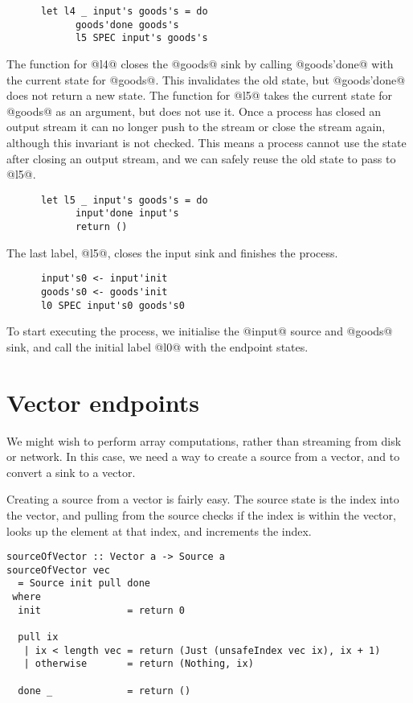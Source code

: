 \begin{lstlisting}
      let l4 _ input's goods's = do
            goods'done goods's
            l5 SPEC input's goods's
\end{lstlisting}

The function for @l4@ closes the @goods@ sink by calling @goods'done@ with the current state for @goods@.
This invalidates the old state, but @goods'done@ does not return a new state.
The function for @l5@ takes the current state for @goods@ as an argument, but does not use it.
Once a process has closed an output stream it can no longer push to the stream or close the stream again, although this invariant is not checked.
This means a process cannot use the state after closing an output stream, and we can safely reuse the old state to pass to @l5@.

\begin{lstlisting}
      let l5 _ input's goods's = do
            input'done input's
            return ()
\end{lstlisting}

The last label, @l5@, closes the input sink and finishes the process.

\begin{lstlisting}
      input's0 <- input'init
      goods's0 <- goods'init
      l0 SPEC input's0 goods's0
\end{lstlisting}

To start executing the process, we initialise the @input@ source and @goods@ sink, and call the initial label @l0@ with the endpoint states.

\section{Vector endpoints}

We might wish to perform array computations, rather than streaming from disk or network.
In this case, we need a way to create a source from a vector, and to convert a sink to a vector.

Creating a source from a vector is fairly easy.
The source state is the index into the vector, and pulling from the source checks if the index is within the vector, looks up the element at that index, and increments the index.

\begin{lstlisting}
sourceOfVector :: Vector a -> Source a
sourceOfVector vec
  = Source init pull done
 where
  init               = return 0

  pull ix
   | ix < length vec = return (Just (unsafeIndex vec ix), ix + 1)
   | otherwise       = return (Nothing, ix)

  done _             = return ()
\end{lstlisting}

